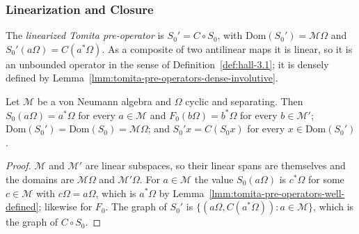 \subsubsection{Linearization and Closure}

\begin{definition}
    \label{def:linearized-tomita-pre-operator}
    \leanok
    The \emph{linearized Tomita pre-operator} is $S_0' = C \circ S_0$, with $\text{Dom}(S_0') = \mathcal{M}\Omega$ and $S_0'(a\Omega) = C(a^*\Omega)$. As a composite of two antilinear maps it is linear, so it is an unbounded operator in the sense of Definition~\ref{def:hall-3.1}; it is densely defined by Lemma~\ref{lmm:tomita-pre-operators-dense-involutive}.
\end{definition}

\begin{lemma}
    \label{lmm:tomita-pre-operators-apply}
    \leanok
    Let $\mathcal{M}$ be a von Neumann algebra and $\Omega$ cyclic and separating. Then $S_0(a\Omega) = a^*\Omega$ for every $a \in \mathcal{M}$ and $F_0(b\Omega) = b^*\Omega$ for every $b \in \mathcal{M}'$; $\text{Dom}(S_0') = \text{Dom}(S_0) = \mathcal{M}\Omega$; and $S_0' x = C(S_0 x)$ for every $x \in \text{Dom}(S_0')$.
\end{lemma}
\begin{proof}
    \leanok
    $\mathcal{M}$ and $\mathcal{M}'$ are linear subspaces, so their linear spans are themselves and the domains are $\mathcal{M}\Omega$ and $\mathcal{M}'\Omega$. For $a \in \mathcal{M}$ the value $S_0(a\Omega)$ is $c^*\Omega$ for some $c \in \mathcal{M}$ with $c\Omega = a\Omega$, which is $a^*\Omega$ by Lemma~\ref{lmm:tomita-pre-operators-well-defined}; likewise for $F_0$. The graph of $S_0'$ is $\{(a\Omega, C(a^*\Omega)) : a \in \mathcal{M}\}$, which is the graph of $C \circ S_0$.
\end{proof}

